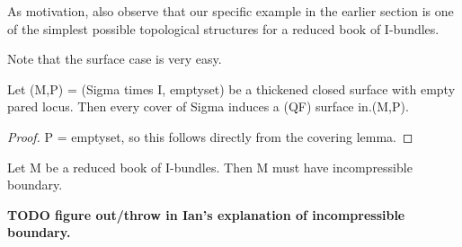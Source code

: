 As motivation, also observe that our specific example in the earlier section is
one of the simplest possible topological structures for a reduced book of
I-bundles.

Note that the surface case is very easy.

\begin{prop}

Let (M,P) = (Sigma times I, emptyset) be a thickened closed surface with empty
pared locus. Then every cover of Sigma induces a (QF) surface in.(M,P).

\end{prop}

\begin{proof}

P = emptyset, so this follows directly from the covering lemma.

\end{proof}

\begin{prop}

Let M be a reduced book of I-bundles. Then M must have incompressible boundary.


\end{prop}

\textbf{TODO figure out/throw in Ian's explanation of incompressible boundary.}
